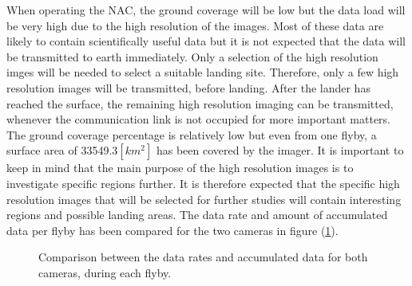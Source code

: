 When operating the NAC, the ground coverage will be low but the data load will be very high due to the high resolution of the images. Most of these data are likely to contain scientifically useful data but it is not expected that the data will be transmitted to earth immediately. Only a selection of the high resolution imges will be needed to select a suitable landing site. Therefore, only a few high resolution images will be transmitted, before landing. After the lander has reached the surface, the remaining high resolution imaging can be transmitted, whenever the communication link is not occupied for more important matters. The ground coverage percentage is relatively low but even from one flyby, a surface area of 33549.3$[km^2]$ has been covered by the imager. It is important to keep in mind that the main purpose of the high resolution images is to investigate specific regions further. It is therefore expected that the specific high resolution images that will be selected for further studies will contain interesting regions and possible landing areas. The data rate and amount of accumulated data per flyby has been compared for the two cameras in figure (\ref{fig:data_gen_wac_nac_compare1}).
\begin{figure}[htb]
    \centering
    \captionsetup[subfigure]{width=0.45\textwidth}
    \caption{Comparison between the data rates and accumulated data for both cameras, during each flyby.}\label{fig:data_gen_wac_nac_compare1}
\end{figure}
